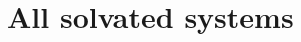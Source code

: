 %  
%  
  
  \section{All solvated systems}\label{S-section:solvation}
  
  \newlength{\tempdima}
  \newcommand{\rowname}[1]%
  {\rotatebox{90}{\makebox[\tempdima][c]{\textbf{#1}}}}
  
  \renewcommand{\thesubfigure}{\alph{subfigure}}
  \newcommand{\mycaption}[1]%
  {\refstepcounter{subfigure}\textbf{(\thesubfigure) }{\ignorespaces #1}}  
  
